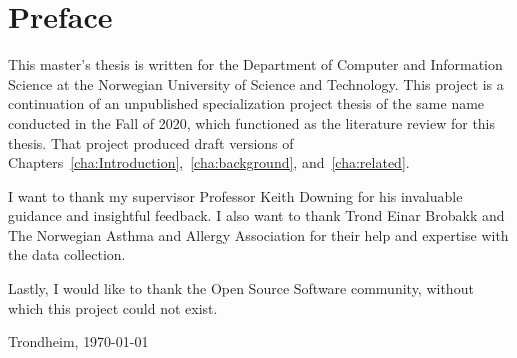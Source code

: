 \chapter*{Preface}

This master's thesis is written for the Department of Computer and Information Science at the Norwegian University of Science and Technology.
This project is a continuation of an unpublished specialization project thesis of the same name conducted in the Fall of 2020, which functioned as the literature review for this thesis. That project produced draft versions of Chapters~\ref{cha:Introduction},~\ref{cha:background}, and~\ref{cha:related}.

I want to thank my supervisor Professor Keith Downing for his invaluable guidance and insightful feedback. I also want to thank Trond Einar Brobakk and The Norwegian Asthma and Allergy Association for their help and expertise with the data collection.

Lastly, I would like to thank the Open Source Software community, without which this project could not exist.
\vfill
\begin{flushright}
    \thesisAuthor\par
    Trondheim, {\usdate\today}
\end{flushright}